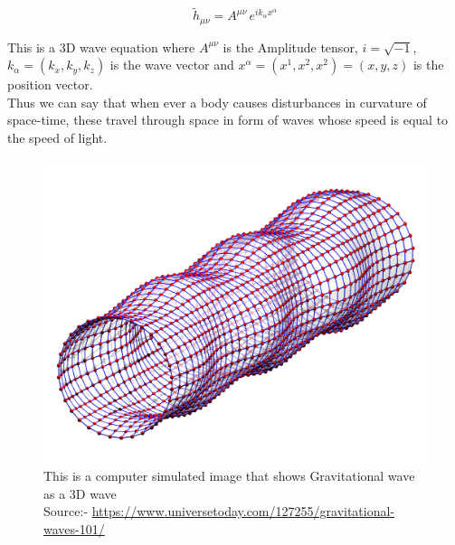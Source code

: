  \begin{equation}
     \tilde{h}_{\mu\nu} = A^{\mu\nu}\, e^{ik_{\alpha}x^{\alpha}}
 \end{equation}
 
 \noindent This is a 3D wave equation where $A^{\mu\nu}$ is the Amplitude tensor, $i = \sqrt{-1} $, $k_{\alpha} = (k_{x},k_{y},k_{z})$ is the wave vector and $x^{\alpha} = (x^{1},x^{2},x^{2}) = (x,y,z)$ is the position vector.
 \\
 
 Thus we can say that when ever a body causes disturbances in curvature of space-time, these travel through space in form of waves whose speed is equal to the speed of light.  
 
 \begin{figure}[h]
     \centering
     \includegraphics[scale=0.13]{images.tex/gw_representation.png}
     \caption{This is a computer simulated image that shows Gravitational wave as a 3D wave\\ Source:- \url{https://www.universetoday.com/127255/gravitational-waves-101/}}
 \end{figure}
